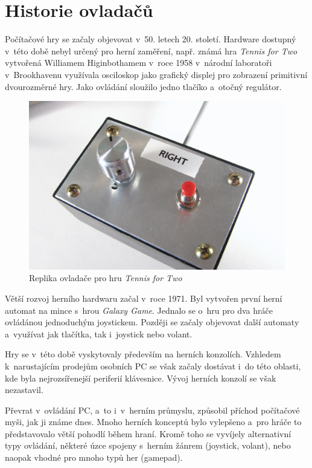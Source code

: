 \documentclass[thesis=B,czech,hidelinks]{FITthesis}[2012/06/26] %
\begin{document}
\section{Historie ovladačů}

Počítačové hry se začaly objevovat v~50. letech 20. století. Hardware dostupný v~této době nebyl určený pro herní zaměření, např. známá hra \textit{Tennis for Two} vytvořená Williamem Higinbothamem v~roce 1958 v~národní laboratoři v~Brookhavenu využívala osciloskop jako grafický displej pro zobrazení primitivní dvourozměrné hry. Jako ovládání sloužilo jedno tlačíko a~otočný regulátor.\cite{gamevshardware}

\begin{figure}
\center
\includegraphics[width=\textwidth/2]{first_controller}
\caption{Replika ovladače pro hru \textit{Tennis for Two}\cite{gamevshardware}}
\end{figure}


Větší rozvoj herního hardwaru začal v~roce 1971. Byl vytvořen první herní automat na mince s~hrou \textit{Galaxy Game}. Jednalo se o~hru pro dva hráče ovládánou jednoduchým joystickem. Později se začaly objevovat další automaty a~využívat jak tlačítka, tak i~joystick nebo volant.

Hry se v~této době vyskytovaly především na herních konzolích. Vzhledem k~narustajícím prodejům osobních PC se však začaly dostávat i~do této oblasti, kde byla nejrozsířenejší periferií klávesnice. Vývoj herních konzolí se však nezastavil.

Převrat v~ovládání PC, a~to i~v~herním průmyslu, způsobil příchod počítačové myši, jak ji známe dnes. Mnoho herních konceptů bylo vylepšeno a~pro hráče to představovalo větší pohodlí během hraní. Kromě toho se vyvíjely alternativní typy ovládání, některé úzce spojeny s~herním žánrem (joystick, volant), nebo naopak vhodné pro mnoho typů her (gamepad). \cite{gamevshardware}
\end{document}
